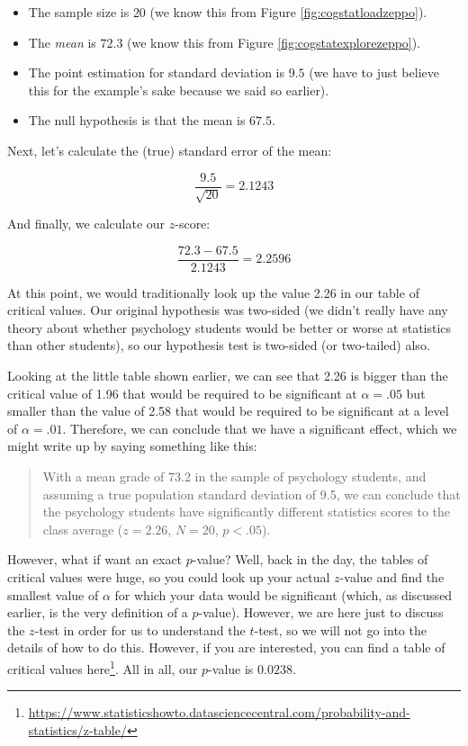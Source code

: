 \documentclass[
  11pt,
  a4paper,
  twoside,symmetric,openright]{book}
\providecommand{\tightlist}{%
  \setlength{\itemsep}{0pt}\setlength{\parskip}{0pt}}
\theoremstyle{break}
\theoremstyle{break}
\DeclareRobustCommand{\href}[2]{#2\footnote{\url{#1}}}
\begin{document}
\begin{itemize}
\tightlist
\item
  The sample size is \(20\) (we know this from Figure \ref{fig:cogstatloadzeppo}).
\item
  The \emph{mean} is \(72.3\) (we know this from Figure \ref{fig:cogstatexplorezeppo}).
\item
  The point estimation for standard deviation is \(9.5\) (we have to just believe this for the example's sake because we said so earlier).
\item
  The null hypothesis is that the mean is \(67.5\).
\end{itemize}

Next, let's calculate the (true) standard error of the mean:

\[
\frac{9.5}{\sqrt{20}} = 2.1243
\]

And finally, we calculate our \(z\)-score:

\[
\frac{72.3-67.5}{2.1243} = 2.2596
\]

At this point, we would traditionally look up the value 2.26 in our table of critical values. Our original hypothesis was two-sided (we didn't really have any theory about whether psychology students would be better or worse at statistics than other students), so our hypothesis test is two-sided (or two-tailed) also.

Looking at the little table shown earlier, we can see that 2.26 is bigger than the critical value of 1.96 that would be required to be significant at \(\alpha = .05\) but smaller than the value of 2.58 that would be required to be significant at a level of \(\alpha = .01\). Therefore, we can conclude that we have a significant effect, which we might write up by saying something like this:

\begin{quote}
With a mean grade of 73.2 in the sample of psychology students, and assuming a true population standard deviation of 9.5, we can conclude that the psychology students have significantly different statistics scores to the class average (\(z = 2.26\), \(N=20\), \(p<.05\)).
\end{quote}

However, what if want an exact \(p\)-value? Well, back in the day, the tables of critical values were huge, so you could look up your actual \(z\)-value and find the smallest value of \(\alpha\) for which your data would be significant (which, as discussed earlier, is the very definition of a \(p\)-value). However, we are here just to discuss the \(z\)-test in order for us to understand the \(t\)-test, so we will not go into the details of how to do this. However, if you are interested, you can find a table of critical values \href{https://www.statisticshowto.datasciencecentral.com/probability-and-statistics/z-table/}{here}. All in all, our \(p\)-value is \(0.0238\).
\end{document}
